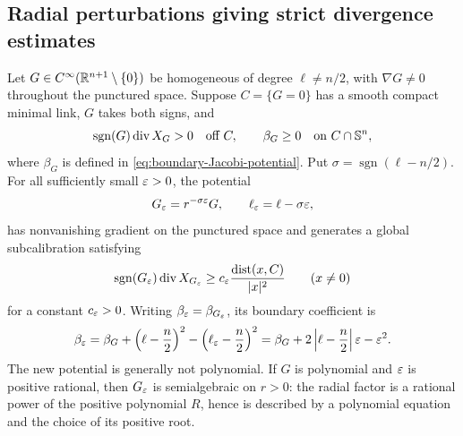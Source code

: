 \subsection{Radial perturbations giving strict divergence estimates}

\begin{proposition}
\label{prop:radial-strictification}
Let \(G\in C^\infty(\mathbb R^{n+1}\setminus\{0\})\) be homogeneous of degree
\(\ell\neq n/2\), with \(\nabla G\neq0\) throughout the punctured space.
Suppose \(C=\{G=0\}\) has a smooth compact minimal link,
\(G\) takes both signs, and
\[
 \operatorname{sgn}(G)\operatorname{div} X_G>0\quad\text{off }C,
 \qquad\beta_G\geq0\quad\text{on }C\cap\mathbb S^n,
\]
where \(\beta_G\) is defined in \eqref{eq:boundary-Jacobi-potential}.
Put \(\sigma=\operatorname{sgn}(\ell-n/2)\).  For all sufficiently small
\(\varepsilon>0\), the potential
\begin{equation}\label{eq:strictifying-potential}
 G_\varepsilon=r^{-\sigma\varepsilon}G,\qquad \ell_\varepsilon=\ell-\sigma\varepsilon,
\end{equation}
has nonvanishing gradient on the punctured space and generates a global
subcalibration satisfying
\begin{equation}\label{eq:strictified-distance-bound}
 \operatorname{sgn}(G_\varepsilon)\operatorname{div} X_{G_\varepsilon}
 \geq c_\varepsilon\frac{\operatorname{dist}(x,C)}{|x|^2}
 \qquad(x\neq0)
\end{equation}
for a constant \(c_\varepsilon>0\).  Writing \(\beta_\varepsilon=\beta_{G_\varepsilon}\), its boundary coefficient is
\begin{equation}\label{eq:strictified-boundary}
 \beta_\varepsilon=\beta_G+\left(\ell-\frac n2\right)^2
                 -\left(\ell_\varepsilon-\frac n2\right)^2
       =\beta_G+2\left|\ell-\frac n2\right|\varepsilon-\varepsilon^2.
\end{equation}
The new potential is generally not polynomial. If \(G\) is polynomial
and \(\varepsilon\) is positive rational, then \(G_\varepsilon\) is semialgebraic
on \(r>0\): the radial factor is a rational power of the positive
polynomial \(R\), hence is described by a polynomial equation and
the choice of its positive root.
\end{proposition}


